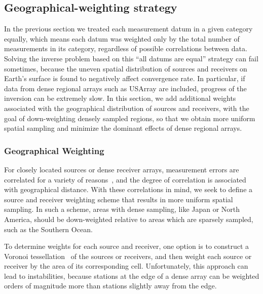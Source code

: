 \subsection{Geographical-weighting strategy}
\label{sec:geographical_weights}

In the previous section we treated each measurement datum in a given category 
equally, which means each datum was weighted only by the total number of measurements 
in its category, regardless of possible correlations between data. Solving the 
inverse problem based on this ``all datums are equal'' strategy can fail sometimes, 
because the uneven spatial distribution of sources 
and receivers on Earth's surface is found to negatively affect convergence rate. 
In particular, if data from dense regional arrays such as USArray are included,  progress 
of the inversion can be extremely slow.  
In this section, we add additional weights associated with the geographical 
distribution of sources and receivers, with the goal of down-weighting 
densely sampled regions, so that we obtain more uniform spatial sampling
and minimize the dominant effects of dense regional arrays. 
  
\subsubsection{Geographical Weighting}
\label{sec:geographical}

For closely located sources or dense receiver arrays, measurement errors 
are correlated for a variety of reasons~\cite{Li1996}, and the degree of correlation 
is associated with geographical distance.
With these correlations in mind, we seek to define a source and receiver weighting scheme 
that results in more uniform spatial sampling.  In such a scheme, areas with dense sampling, 
like Japan or North America, should be down-weighted relative to areas which are sparsely 
sampled, such as the Southern Ocean.  %

To determine weights for each source and receiver, one option is to construct a Voronoi tessellation~\cite{Du1999} of the sources or receivers, 
and then weight each source or receiver by the area of its corresponding cell.
Unfortunately, this approach can lead to instabilities, because stations at the edge of a dense array can be weighted orders of magnitude more than stations slightly away from the edge. 

